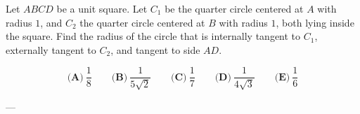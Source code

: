 Let \(ABCD\) be a unit square. Let \(C_1\) be the quarter circle centered at \(A\) with radius \(1\), and \(C_2\) the quarter circle centered at \(B\) with radius \(1\), both lying inside the square. Find the radius of the circle that is internally tangent to \(C_1\), externally tangent to \(C_2\), and tangent to side \(AD\).



\[
\textbf{(A)}\ \dfrac{1}{8}
\qquad
\textbf{(B)}\ \dfrac{1}{5\sqrt2}
\qquad
\textbf{(C)}\ \dfrac{1}{7}
\qquad
\textbf{(D)}\ \dfrac{1}{4\sqrt3}
\qquad
\textbf{(E)}\ \dfrac{1}{6}
\]

---
